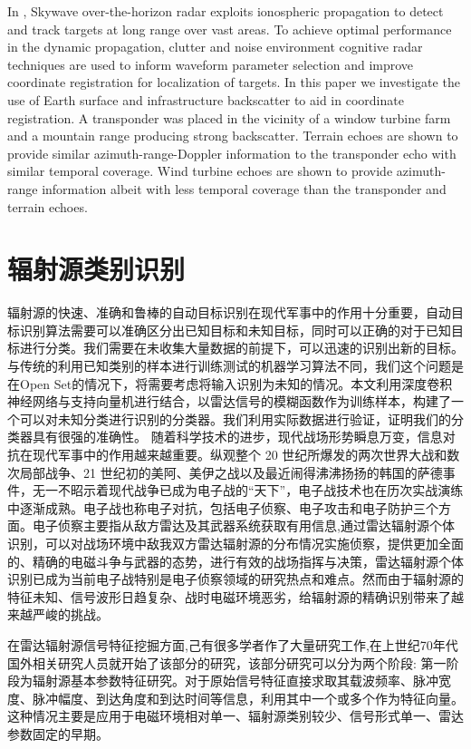 In \cite{holdsworth2017skywave}, Skywave over-the-horizon radar exploits ionospheric propagation to detect and track targets at long range over vast areas. To achieve optimal performance in the dynamic propagation, clutter and noise environment cognitive radar techniques are used to inform waveform parameter selection and improve coordinate registration for localization of targets. In this paper we investigate the use of Earth surface and infrastructure backscatter to aid in coordinate registration. A transponder was placed in the vicinity of a window turbine farm and a mountain range producing strong backscatter. Terrain echoes are shown to provide similar azimuth-range-Doppler information to the transponder echo with similar temporal coverage. Wind turbine echoes are shown to provide azimuth-range information albeit with less temporal coverage than the transponder and terrain echoes.

\section{辐射源类别识别}

辐射源的快速、准确和鲁棒的自动目标识别在现代军事中的作用十分重要，自动目标识别算法需要可以准确区分出已知目标和未知目标，同时可以正确的对于已知目标进行分类。我们需要在未收集大量数据的前提下，可以迅速的识别出新的目标。与传统的利用已知类别的样本进行训练测试的机器学习算法不同，我们这个问题是在Open Set的情况下，将需要考虑将输入识别为未知的情况。本文利用深度卷积神经网络与支持向量机进行结合，以雷达信号的模糊函数作为训练样本，构建了一个可以对未知分类进行识别的分类器。我们利用实际数据进行验证，证明我们的分类器具有很强的准确性。
随着科学技术的进步，现代战场形势瞬息万变，信息对抗在现代军事中的作用越来越重要。纵观整个 20 世纪所爆发的两次世界大战和数次局部战争、21 世纪初的美阿、美伊之战以及最近闹得沸沸扬扬的韩国的萨德事件，无一不昭示着现代战争已成为电子战的“天下”，电子战技术也在历次实战演练中逐渐成熟。电子战也称电子对抗，包括电子侦察、电子攻击和电子防护三个方面。电子侦察主要指从敌方雷达及其武器系统获取有用信息,通过雷达辐射源个体识别，可以对战场环境中敌我双方雷达辐射源的分布情况实施侦察，提供更加全面的、精确的电磁斗争与武器的态势，进行有效的战场指挥与决策，雷达辐射源个体识别已成为当前电子战特别是电子侦察领域的研究热点和难点。然而由于辐射源的特征未知、信号波形日趋复杂、战时电磁环境恶劣，给辐射源的精确识别带来了越来越严峻的挑战。

在雷达辐射源信号特征挖掘方面,己有很多学者作了大量研究工作,在上世纪70年代国外相关研究人员就开始了该部分的研究，该部分研究可以分为两个阶段:
第一阶段为辐射源基本参数特征研究。对于原始信号特征直接求取其载波频率、脉冲宽度、脉冲幅度、到达角度和到达时间等信息，利用其中一个或多个作为特征向量。这种情况主要是应用于电磁环境相对单一、辐射源类别较少、信号形式单一、雷达参数固定的早期。

